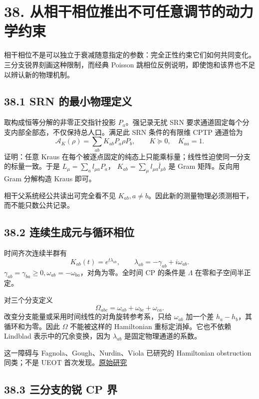 \documentclass[
  11pt,
  oneside]{book}
\begin{document}
\chapter{38. 从相干相位推出不可任意调节的动力学约束}\label{ch-38}\hypertarget{ch-38}{}

相干相位不是可以独立于衰减随意指定的参数：完全正性约束它们如何共同变化。三分支锐界刻画这种限制，而经典
Poisson 跳相位反例说明，即使饱和该界也不足以辨认新的物理机制。

\section{38.1 SRN 的最小物理定义}

取构成恒等分解的非零正交指针投影 \(P_a\)。强记录无扰 SRN
要求通道固定每个分支内部全部态，不仅保持总人口。满足此 SRN 条件的有限维
CPTP 通道恰为 \[
\mathcal A_K(\rho)=\sum_{ab}K_{ab}P_a\rho P_b,\qquad
K\succeq0,\quad K_{aa}=1.
\tag{38.1}
\] 证明：任意 Kraus
在每个被逐点固定的纯态上只能乘标量；线性性迫使同一分支的标量一致。于是
\(L_\mu=\sum_a l_{\mu a}P_a\)，
\(K_{ab}=\sum_\mu l_{\mu a}\bar l_{\mu b}\) 是 Gram 矩阵。反向用 Gram
分解构造 Kraus 即可。

相干父系统经公共读出可完全看不见
\(K_{ab},a\ne b\)。因此新的测量物理必须测相干，而不能只数公共记录。

\section{38.2 连续生成元与循环相位}

时间齐次连续半群有 \[
K_{ab}(t)=e^{t\lambda_{ab}},\qquad
\lambda_{ab}=-\gamma_{ab}+i\omega_{ab}.
\]
\(\gamma_{ab}=\gamma_{ba}\ge0,\omega_{ab}=-\omega_{ba}\)，对角为零。全时间
CP 的条件是 \(\Lambda\) 在零和子空间半正定。

对三个分支定义 \[
\Omega_{abc}=\omega_{ab}+\omega_{bc}+\omega_{ca}.
\tag{38.2}
\] 改变分支能量或采用时间线性的对角旋转参考系，只给 \(\omega_{ab}\)
加一个差 \(h_a-h_b\)，其循环和为零。因此 \(\Omega\) 不能被这样的
Hamiltonian 重标定消掉。它也不依赖 Lindblad 表示中的冗余变换，因为
\(\lambda_{ab}\) 是固定物理通道的系数。

这一障碍与 Fagnola、Gough、Nurdin、Viola 已研究的 Hamiltonian
obstruction 同类；不是 UEOT
首次发现。\href{https://arxiv.org/abs/1811.11784}{原始研究}

\section{38.3 三分支的锐 CP 界}
\end{document}
